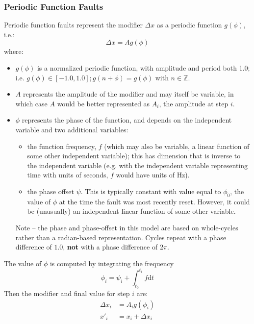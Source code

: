 \documentclass[11pt,fleqn]{report}
\begin{document}
\subsubsection{Periodic Function Faults}
\par Periodic function faults represent the modifier $\Delta x$ as a periodic
function $g(\phi)$, i.e.:
\begin{equation*}
  \Delta x = A g(\phi)
\end{equation*}
where:
\begin{itemize}
 \item $g(\phi)$ is a normalized periodic function, with amplitude and period
   both 1.0; i.e. $g(\phi) \in [-1.0, 1.0]; g(n + \phi) = g(\phi)$ with
   $n \in \mathbb{Z}$.
 \item $A$ represents the amplitude of the modifier and may itself be
   variable, in which case $A$ would be better represented as $A_i$, the
   amplitude at step $i$.
 \item $\phi$ represents the phase of the function, and depends on the
   independent variable and two additional variables:
   \begin{itemize}
     \item the function frequency, $f$ (which may also be variable, a linear
       function of some other independent variable); this has
       dimension that is inverse to the independent variable (e.g. with the
       independent variable representing time with units of seconds, $f$ would
       have units of Hz).
     \item the phase offset $\psi$. This is typically constant with value
       equal to $\phi_0$, the value of $\phi$ at the time the fault was most
       recently reset. However, it could be (unusually) an independent
       linear function of some other variable.
    \end{itemize}
    Note -- the phase and phase-offset in this model are based on
    whole-cycles rather than a radian-based representation.
    Cycles repeat with a phase difference
    of $1.0$, \textbf{not} with a phase difference of $2 \pi$.
\end{itemize}


The value of $\phi$ is computed by integrating the frequency
\begin{equation*}
  \phi_i = \psi_i + \int_{t_0}^{t_i} f \mathrm{d}t
\end{equation*}
Then the modifier and final value for step $i$ are:
\begin{align*}
  \Delta x_i &= A_i g(\phi_i) \\
  x'_i &= x_i + \Delta x_i
\end{align*}
\end{document}
